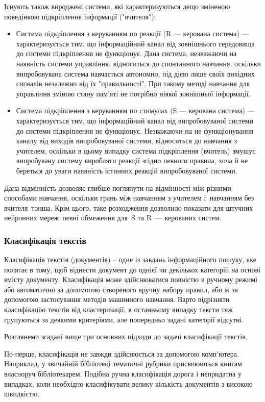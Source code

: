 Існують також вироджені системи, які характеризуються дещо зміненою поведінкою підкріплення інформації ("вчителя"):
\begin{itemize}  
	\item Система підкріплення з керуванням по реакції (R — керована система) — характеризується тим, що інформаційний канал від зовнішнього середовища до системи підкріплення не функціонує. Дана система, незважаючи на наявність системи управління, відноситься до спонтанного навчання, оскільки випробовувана система навчається автономно, під дією лише своїх вихідних сигналів незалежно від їх "правильності". При такому методі навчання для управління зміною стану пам'яті не потрібно ніякої зовнішньої інформації.
	\item Система підкріплення з керуванням по стимулах (S — керована система) — характеризується тим, що інформаційний канал від випробовуваної системи до системи підкріплення не функціонує. Незважаючи на не функціонування каналу від виходів випробовуваної системи, відноситься до навчання з учителем, оскільки в цьому випадку система підкріплення (вчитель) змушує випробувану систему виробляти реакції згідно певного правила, хоча й не береться до уваги наявність істинних реакцій випробовуваної системи.
\end{itemize}

Дана відмінність дозволяє глибше поглянути на відмінності між різними способами навчання, оскільки грань між навчанням з учителем і навчанням без вчителя тонша. Крім цього, таке розходження дозволило показати для штучних нейронних мереж певні обмеження для S та R — керованих систем.

\subsubsection{Класифікація текстів}
Класифікація текстів (документів) – одне із завдань інформаційного пошуку, яке полягає в тому, щоб віднести документ до однієї чи декількох категорій на основі вмісту документу. Класифікація може здійснюватися повністю в ручному режимі або автоматично за допомогою створеного вручну набору правил, або ж за допомогою застосування методів машинного навчання. Варто відрізняти класифікацію текстів від кластеризації, в останньому випадку тексти теж групуються за деякими критеріями, але попередньо задані категорії відсутні.

Розглянемо згадані вище три основних підходи до задачі класифікації текстів.

По-перше, класифікація не завжди здійснюється за допомогою комп'ютера. Наприклад, у звичайній бібліотеці тематичні рубрики присвоюються книгам власноруч бібліотекарем. Подібна ручна класифікація дорога і непридатна у випадках, коли необхідно класифікувати велику кількість документів з високою швидкістю.

